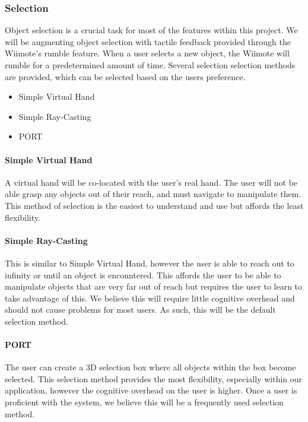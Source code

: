 \subsubsection{Selection}
\label{Design:Interaction:Selection}
Object selection is a crucial task for most of the features within this project.
We will be augmenting object selection with tactile feedback provided through the Wiimote's rumble feature.
When a user selects a new object, the Wiimote will rumble for a predetermined amount of time.
Several selection selection methods are provided, which can be selected based on the users preference.
\begin{itemize}
	\item Simple Virtual Hand
	\item Simple Ray-Casting
	\item PORT
\end{itemize}

\paragraph{Simple Virtual Hand}
A virtual hand will be co-located with the user's real hand.
The user will not be able grasp any objects out of their reach, and must navigate to manipulate them.
This method of selection is the easiest to understand and use but affords the least flexibility.

\paragraph{Simple Ray-Casting}
This is similar to Simple Virtual Hand, however the user is able to reach out to infinity or until an object is encountered.
This affords the user to be able to manipulate objects that are very far out of reach but requires the user to learn to take advantage of this.
We believe this will require little cognitive overhead and should not cause problems for most users.
As such, this will be the default selection method.

\paragraph{PORT}
The user can create a 3D selection box where all objects within the box become selected.
This selection method provides the most flexibility, especially within our application, however the cognitive overhead on the user is  higher.
Once a user is proficient with the system, we believe this will be a frequently used selection method.

